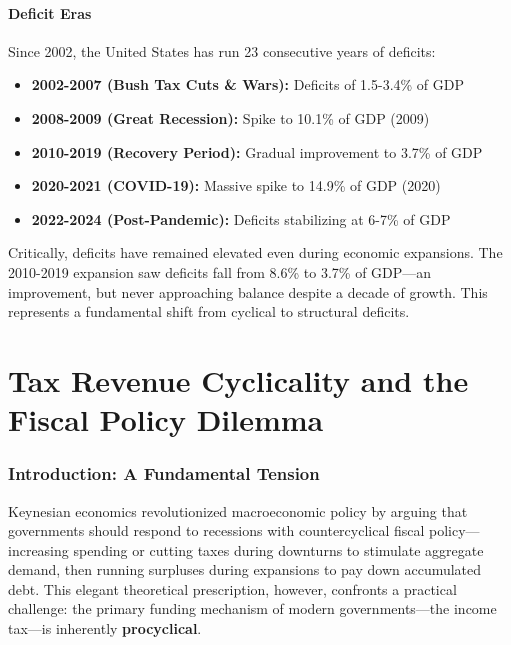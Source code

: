 \documentclass[12pt,letterpaper]{article}
\begin{document}
\subsection{Deficit Eras}

Since 2002, the United States has run 23 consecutive years of deficits:

\begin{itemize}
    \item \textbf{2002-2007 (Bush Tax Cuts \& Wars):} Deficits of 1.5-3.4\% of GDP
    \item \textbf{2008-2009 (Great Recession):} Spike to 10.1\% of GDP (2009)
    \item \textbf{2010-2019 (Recovery Period):} Gradual improvement to 3.7\% of GDP
    \item \textbf{2020-2021 (COVID-19):} Massive spike to 14.9\% of GDP (2020)
    \item \textbf{2022-2024 (Post-Pandemic):} Deficits stabilizing at 6-7\% of GDP
\end{itemize}

Critically, deficits have remained elevated even during economic expansions. The 2010-2019 expansion saw deficits fall from 8.6\% to 3.7\% of GDP—an improvement, but never approaching balance despite a decade of growth. This represents a fundamental shift from cyclical to structural deficits.

\newpage


\part{Tax Revenue Cyclicality and the Fiscal Policy Dilemma}

\section{Introduction: A Fundamental Tension}

Keynesian economics revolutionized macroeconomic policy by arguing that governments should respond to recessions with countercyclical fiscal policy—increasing spending or cutting taxes during downturns to stimulate aggregate demand, then running surpluses during expansions to pay down accumulated debt. This elegant theoretical prescription, however, confronts a practical challenge: the primary funding mechanism of modern governments—the income tax—is inherently \textbf{procyclical}.
\end{document}
